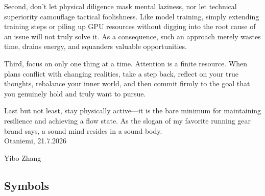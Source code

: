 \documentclass[english,12pt,a4paper,pdftex,elec,utf8]{aaltothesis}
\begin{document}
Second, don't let physical diligence mask mental laziness, nor let technical superiority camouflage tactical foolishness. Like model training, simply extending training steps or piling up GPU resources without digging into the root cause of an issue will not truly solve it. As a consequence, such an approach merely wastes time, drains energy, and squanders valuable opportunities.

Third, focus on only one thing at a time. Attention is a finite resource. When plans conflict with changing realities, take a step back, reflect on your true thoughts, rebalance your inner world, and then commit firmly to the goal that you genuinely hold and truly want to pursue.

Last but not least, stay physically active—it is the bare minimum for maintaining resilience and achieving a flow state. As the slogan of my favorite running gear brand says, a sound mind resides in a sound body.
\\

\vspace{5cm}
Otaniemi, 21.7.2026

\vspace{5mm}
{\hfill Yibo Zhang \hspace{1cm}}

\newpage


\thesistableofcontents



\subsection*{Symbols}
\end{document}

